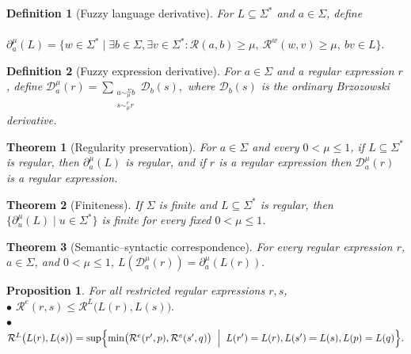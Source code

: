 \documentclass{easychair}
\newtheorem{definition}{Definition}
\newtheorem{theorem}{Theorem}
\newtheorem{proposition}{Proposition}
\begin{document}
\begin{definition}[Fuzzy language derivative]
For $L\subseteq\Sigma^\ast$ and $a\in\Sigma$, define\\
\ \ \ \ $
\partial_a^\mu(L)
=
\{w\in\Sigma^\ast\mid
\exists b\in\Sigma,\exists v\in\Sigma^\ast:
\mathcal R(a,b)\ge\mu,\ 
\mathcal R^w(w,v)\ge\mu,\ 
bv\in L
\}.
$
\end{definition}
\begin{definition}[Fuzzy expression derivative]
For $a\in\Sigma$ %
and a regular expression $r$, define
$\mathcal D_a^\mu(r)={\sum_{\substack{a\sim_\mu^\Sigma b\\ s\sim_\mu^e r}}\mathcal D_b(s),}$
where $\mathcal D_b(s)$ is the ordinary Brzozowski derivative.
\end{definition}
\begin{theorem}[Regularity preservation] For  $a\in\Sigma$ and every $0<\mu\le1$, if $L\subseteq\Sigma^\ast$ is regular, then
$\partial_a^\mu(L)$ is regular, and  if $r$ is a regular expression then $\mathcal D_a^\mu(r)$ is a regular expression.
\end{theorem}

\begin{theorem}[Finiteness]\label{finiteness}
If $\Sigma$ is finite and $L\subseteq\Sigma^\ast$ is regular, then
$
\{\partial_u^\mu(L)\mid u\in\Sigma^\ast\}
$
is finite for every fixed $0<\mu\le1$.
\end{theorem}

\begin{theorem}[Semantic--syntactic correspondence]
For every regular expression $r$,  $a\in\Sigma$, and 
$0<\mu\le1$, $
L(\mathcal D_a^\mu(r))
=
\partial_a^\mu(L(r)).
$
\end{theorem}

\begin{proposition} For all restricted regular expressions $r,s$,\\
$\bullet$ 
$
\mathcal{R}^e(r,s)
\le
\mathcal{R}^L\bigl(L(r),L(s)\bigr).
$\\
$\bullet$ $\mathcal{R}^L\bigl(L(r),L(s)\bigr)
=
\sup\Bigl\{
\min\bigl(
\mathcal{R}^e(r',p),
\mathcal{R}^e(s',q)
\bigr)
\;\Bigm|\;%
L(r')=L(r),
L(s')=L(s),
L(p)=L(q)
\Bigr\}.$
\end{proposition}
\end{document}
